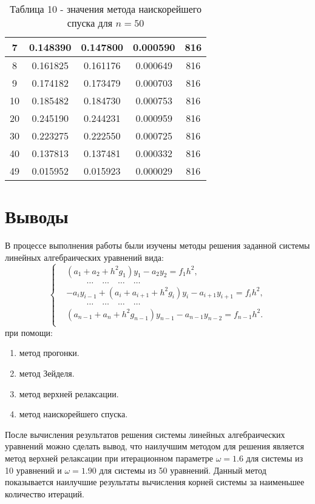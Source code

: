 \documentclass[a4paper,12pt]{article}
\begin{document}
{\begin{table}[h]
\begin{tabular}{|c|c|c|c|c|}
				7 & 0.148390 & 0.147800 & 0.000590 & 816 \\
				\hline
				8 & 0.161825 & 0.161176 & 0.000649 & 816 \\
				\hline
				9 & 0.174182 & 0.173479 & 0.000703 & 816 \\
				\hline
				10 & 0.185482 & 0.184730 & 0.000753 & 816 \\
				\hline
				20 & 0.245190 & 0.244231 & 0.000959 & 816 \\
				\hline
				30 & 0.223275 & 0.222550 & 0.000725 & 816 \\
				\hline
				40 & 0.137813 & 0.137481 & 0.000332 & 816 \\
				\hline
				49 & 0.015952 & 0.015923 & 0.000029 & 816 \\
				\hline
			\end{tabular}
			\caption*{\small{Таблица 10 - значения метода наискорейшего спуска для $n = 50$}}
		\end{table}
		\clearpage
		\section{Выводы}
		\hspace{1.25cm}В процессе выполнения работы были изучены методы решения заданной системы линейных алгебраических уравнений вида:
		\begin{equation*}
			\begin{cases}
				&(a_1 + a_2 + h^2g_1)y_1 - a_2y_2 = f_1h^2,\\
				&\hspace{1cm}\dots \quad \dots \quad \dots \quad \dots\\
				&-a_iy_{i-1} + (a_i + a_{i+1} + h^2g_i)y_i - a_{i+1}y_{i+1} = f_ih^2,\\
				&\hspace{1cm}\dots \quad \dots \quad \dots \quad \dots\\
				&(a_{n-1} + a_{n} + h^2g_{n-1})y_{n-1} - a_{n-1}y_{n-2} = f_{n-1}h^2.\\
			\end{cases}
		\end{equation*}
		при помощи:
		\begin{enumerate}[label = \arabic*.]
			\item метод прогонки.
			\item метод Зейделя.
			\item метод верхней релаксации.
			\item метод наискорейшего спуска.
		\end{enumerate}
		
		После вычисления результатов решения системы линейных алгебраических уравнений можно сделать вывод, 
		что наилучшим методом для решения является метод верхней релакса\-ции при итерационном параметре $\omega = 1.6$ для системы из 10 уравнений и $\omega = 1.90$ для системы из 50 уравнений. 
		Данный метод показывается наилучшие результа\-ты вычисления корней системы за наименьшее количество итераций.
	}
	\clearpage
\end{document}
